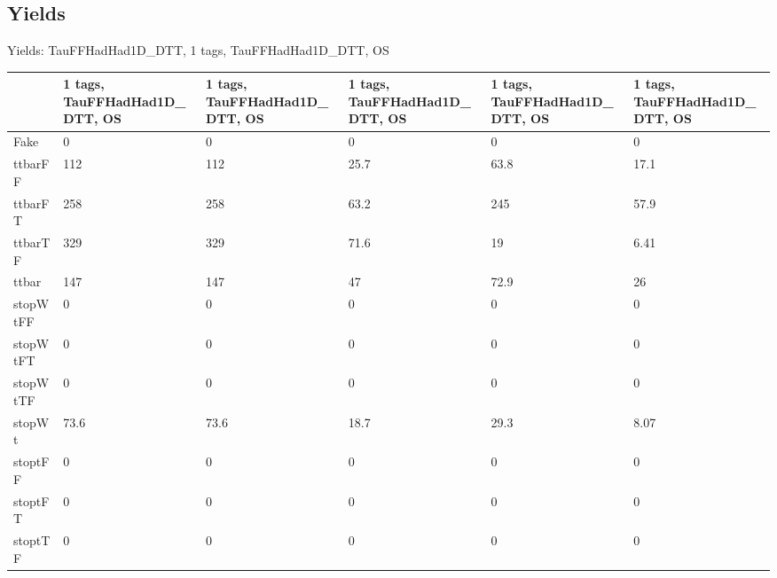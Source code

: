 
\subsection{Yields}

\begin{frame}{Yields: TauFFHadHad1D\_DTT, 1 tags, TauFFHadHad1D\_DTT, OS}
\begin{center}
  \begin{tabular}{l| >{\centering\let\newline\\\arraybackslash\hspace{0pt}}m{1.4cm}| >{\centering\let\newline\\\arraybackslash\hspace{0pt}}m{1.4cm}| >{\centering\let\newline\\\arraybackslash\hspace{0pt}}m{1.4cm}| >{\centering\let\newline\\\arraybackslash\hspace{0pt}}m{1.4cm}| >{\centering\let\newline\\\arraybackslash\hspace{0pt}}m{1.4cm}}
    & 1 tags, TauFFHadHad1D\_DTT, OS & 1 tags, TauFFHadHad1D\_DTT, OS & 1 tags, TauFFHadHad1D\_DTT, OS & 1 tags, TauFFHadHad1D\_DTT, OS & 1 tags, TauFFHadHad1D\_DTT, OS \\
 \hline \hline
    Fake& 0 & 0 & 0 & 0 & 0 \\
 \hline
    ttbarFF& 112 & 112 & 25.7 & 63.8 & 17.1 \\
 \hline
    ttbarFT& 258 & 258 & 63.2 & 245 & 57.9 \\
 \hline
    ttbarTF& 329 & 329 & 71.6 & 19 & 6.41 \\
 \hline
    ttbar& 147 & 147 & 47 & 72.9 & 26 \\
 \hline
    stopWtFF& 0 & 0 & 0 & 0 & 0 \\
 \hline
    stopWtFT& 0 & 0 & 0 & 0 & 0 \\
 \hline
    stopWtTF& 0 & 0 & 0 & 0 & 0 \\
 \hline
    stopWt& 73.6 & 73.6 & 18.7 & 29.3 & 8.07 \\
 \hline
    stoptFF& 0 & 0 & 0 & 0 & 0 \\
 \hline
    stoptFT& 0 & 0 & 0 & 0 & 0 \\
 \hline
    stoptTF& 0 & 0 & 0 & 0 & 0 \\

\end{tabular}
\end{center}
\end{frame}
